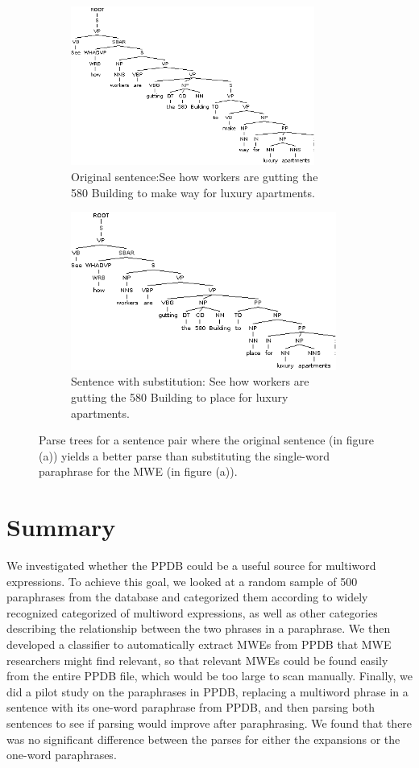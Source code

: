 \documentclass[11pt]{article}
\begin{document}
\begin{figure}
\centering
\begin{subfigure}{.5\textwidth}
  \centering
  \includegraphics[width=80mm]{figs/make_way_tree.png}
  \caption{Original sentence:See how workers are gutting the \\
 580 Building to make way for luxury apartments.}
  \label{fig:sub1}
\end{subfigure}%
\begin{subfigure}{.5\textwidth}
  \centering
  \includegraphics[width=87mm]{figs/place_tree.png}
  \caption{Sentence with substitution: See how workers are gutting the 580 Building to place for luxury apartments.}
  \label{fig:sub2}
\end{subfigure}
\caption{Parse trees for a sentence pair where the original sentence (in figure (a)) yields a better parse than substituting the single-word paraphrase for the MWE (in figure (a)).}
\label{place}
\end{figure}

\section{Summary}
We investigated whether the PPDB could be a useful source for multiword expressions. To achieve this goal, we looked at a random sample of 500 paraphrases from the database and categorized them according to widely recognized categorized of multiword expressions, as well as other categories describing the relationship between the two phrases in a paraphrase. We then developed a classifier to automatically extract MWEs from PPDB that MWE researchers might find relevant, so that relevant MWEs could be found easily from the entire PPDB file, which would be too large to scan manually. Finally, we did a pilot study on the paraphrases in PPDB, replacing a multiword phrase in a sentence with its one-word paraphrase from PPDB, and then parsing both sentences to see if parsing would improve after paraphrasing. We found that there was no significant difference between the parses for either the expansions or the one-word paraphrases.
\end{document}
